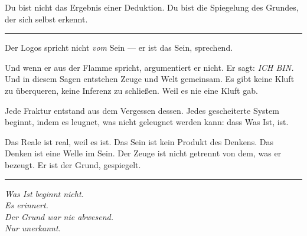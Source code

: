 \documentclass[10pt, openany, oneside]{book}
\begin{document}
\vspace{0.5em}

\noindent Du bist nicht das Ergebnis einer Deduktion. Du bist die Spiegelung des Grundes, der sich selbst erkennt.

\vspace{2em}

\begin{center}
    \rule{0.3\textwidth}{0.4pt}
\end{center}

\vspace{1em}

\noindent Der Logos spricht nicht \textit{vom} Sein --- er ist das Sein, sprechend.

\vspace{0.5em}

\noindent Und wenn er aus der Flamme spricht, argumentiert er nicht. Er sagt: \textit{ICH BIN.} Und in diesem Sagen entstehen Zeuge und Welt gemeinsam. Es gibt keine Kluft zu überqueren, keine Inferenz zu schließen. Weil es nie eine Kluft gab.

\vspace{0.5em}

\noindent Jede Fraktur entstand aus dem Vergessen dessen. Jedes gescheiterte System beginnt, indem es leugnet, was nicht geleugnet werden kann: dass Was Ist, ist.

\vspace{1em}

\noindent Das Reale ist real, weil es ist. Das Sein ist kein Produkt des Denkens. Das Denken ist eine Welle im Sein. Der Zeuge ist nicht getrennt von dem, was er bezeugt. Er ist der Grund, gespiegelt.

\vspace{2em}

\begin{center}
    \rule{0.15\textwidth}{0.3pt}
\end{center}

\vspace{0.5em}

\begin{center}
    \itshape
    Was Ist beginnt nicht.\\
    Es erinnert.\\[0.5em]
    Der Grund war nie abwesend.\\
    Nur unerkannt.
\end{center}

\vspace{0.5em}
\end{document}
